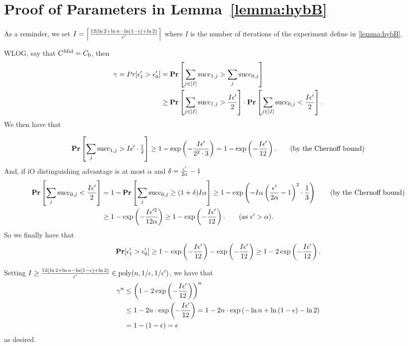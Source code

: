 \section{Proof of Parameters in Lemma~\ref{lemma:hybB}}
\label{appendix:paramHybB}

As a reminder, we set $I =\left\lceil \frac{12\left(\ln 2 + \ln n - \ln\left(1 - \epsilon\right) + \ln 2\right)}{\epsilon'} \right\rceil$ where $I$
is the number of iterations of the experiment define in \cref{lemma:hybB}.

WLOG, say that $C^{\text{Mid}} = C_0$, then
\begin{align*}
	\gamma = Pr[\epsilon'_1 > \epsilon'_0] &= \operatorname*{\mathbf{Pr}}\left[\sum_{j \in [I]} \text{succ}_{1, j} > \sum_{j} \text{succ}_{0, j}\right]\\
	&\geq \operatorname*{\mathbf{Pr}}\left[\sum_{j \in [I]} \text{succ}_{1, j} > \frac{I\epsilon'}{2}\right] \cdot \operatorname*{\mathbf{Pr}}\left[\sum_{j \in [I]} \text{succ}_{0, j} < \frac{I\epsilon'}{2}\right].
\end{align*}
We then have that

\begin{align*}
	\operatorname*{\mathbf{Pr}}\left[\sum_{j} \text{succ}_{1, j} > I\epsilon' \cdot \tfrac{1}{2}\right] \geq 1 - \exp\left( -\frac{I\epsilon'}{2^2 \cdot 3}\right) =  1 - \exp\left( -\frac{I\epsilon'}{12}\right). \tag{by the Chernoff bound}
\end{align*}
And, if iO distinguishing advantage is at most $\alpha$ and $\delta = \frac{\epsilon'}{2\alpha} - 1$
\begin{align*}
	\Pr\left[\sum_{j} \success_{0, j} < \frac{I\epsilon'}{2}\right] &= 1 - \Pr\left[\sum_{j} \success_{0, j} \geq  (1 + \delta) I\alpha\right]
	\geq 1 - \exp\left( - I \alpha \left(\frac{\eps'}{2\alpha} - 1\right)^2 \cdot \frac{1}{3} \right) \tag{by the Chernoff bound}\\
	&\geq 1 - \exp\left( - \frac{I\eps'^2}{12\alpha}\right) \geq 1 - \exp\left(-\frac{I\eps'}{12}\right). \tag{as $\eps' > \alpha$}.
\end{align*}
So we finally have that
\begin{equation}
	\operatorname*{\mathbf{Pr}}[\epsilon'_1 > \epsilon'_0] \geq 1 - \exp\left(-\frac{I\epsilon'}{12}\right) - \exp\left( -\frac{I\epsilon'}{12}\right) \geq 1 - 2\exp\left( -\frac{I\epsilon'}{12}\right). 
\end{equation}

Setting $I \geq \frac{12\left(\ln 2 + \ln n - \ln\left(1 - \epsilon\right) + \ln 2\right)}{\epsilon'} \in \operatorname{poly}(n, 1/\epsilon, 1/\epsilon')$, we have that
\begin{align*}
	\gamma^n &\leq \left(1 - 2\exp\left( -\frac{I\epsilon'}{12}\right)\right)^n \\
	&\leq 1 - 2n \cdot \exp\left( -\frac{I\epsilon'}{12}\right) = 1 - 2n \cdot \exp\left(-\ln n + \ln\left(1 - \epsilon\right) - \ln 2\right)\\
	&= 1 - \left(1 - \epsilon\right) = \epsilon
\end{align*}
as desired.
